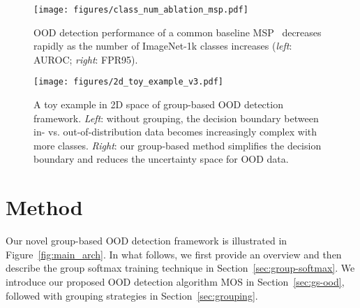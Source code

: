 \documentclass[final]{cvpr}
\begin{document}
\begin{figure}[h]
    \centering
    \texttt{[image: figures/class\_num\_ablation\_msp.pdf]}
    \caption{\small OOD detection performance of a common baseline MSP~\cite{hendrycks2016baseline} decreases rapidly as the number of ImageNet-1k classes increases (\emph{left}: AUROC; \emph{right}: FPR95).} \label{fig:class_num_ablation_baseline}
\end{figure}





















\begin{figure}[t]
    \centering
    \texttt{[image: figures/2d\_toy\_example\_v3.pdf]}
    \caption{\small{A toy example in 2D space of group-based OOD detection framework. \emph{Left}: without grouping, the decision boundary between in- vs. out-of-distribution data becomes increasingly complex with more classes. \emph{Right}: our group-based method simplifies the decision boundary and reduces the uncertainty space for OOD data.}}
    \vspace{-0.5cm}
    \label{fig:2d_toy_example}
\end{figure}

\vspace{-0.4cm}

\section{Method}

Our novel group-based OOD detection framework is illustrated
in Figure~\ref{fig:main_arch}. In what follows, we first provide an overview and then describe the group softmax training technique in Section~\ref{sec:group-softmax}. We introduce our proposed OOD detection algorithm MOS in Section~\ref{sec:gs-ood}, followed with grouping strategies in Section~\ref{sec:grouping}. 



\vspace{-0.3cm}
\end{document}
